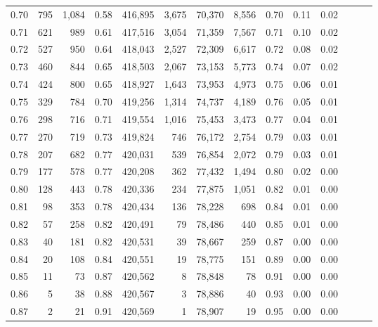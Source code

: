 \begin{tabular}{rrrrrrrrrrrrrr}
0.70 &     795 &  1,084 &  0.58 &  416,895 &    3,675 &  70,370 &   8,556 &  0.70 &  0.11 &      0.02 \\
0.71 &     621 &    989 &  0.61 &  417,516 &    3,054 &  71,359 &   7,567 &  0.71 &  0.10 &      0.02 \\
0.72 &     527 &    950 &  0.64 &  418,043 &    2,527 &  72,309 &   6,617 &  0.72 &  0.08 &      0.02 \\
0.73 &     460 &    844 &  0.65 &  418,503 &    2,067 &  73,153 &   5,773 &  0.74 &  0.07 &      0.02 \\
0.74 &     424 &    800 &  0.65 &  418,927 &    1,643 &  73,953 &   4,973 &  0.75 &  0.06 &      0.01 \\
0.75 &     329 &    784 &  0.70 &  419,256 &    1,314 &  74,737 &   4,189 &  0.76 &  0.05 &      0.01 \\
0.76 &     298 &    716 &  0.71 &  419,554 &    1,016 &  75,453 &   3,473 &  0.77 &  0.04 &      0.01 \\
0.77 &     270 &    719 &  0.73 &  419,824 &      746 &  76,172 &   2,754 &  0.79 &  0.03 &      0.01 \\
0.78 &     207 &    682 &  0.77 &  420,031 &      539 &  76,854 &   2,072 &  0.79 &  0.03 &      0.01 \\
0.79 &     177 &    578 &  0.77 &  420,208 &      362 &  77,432 &   1,494 &  0.80 &  0.02 &      0.00 \\
0.80 &     128 &    443 &  0.78 &  420,336 &      234 &  77,875 &   1,051 &  0.82 &  0.01 &      0.00 \\
0.81 &      98 &    353 &  0.78 &  420,434 &      136 &  78,228 &     698 &  0.84 &  0.01 &      0.00 \\
0.82 &      57 &    258 &  0.82 &  420,491 &       79 &  78,486 &     440 &  0.85 &  0.01 &      0.00 \\
0.83 &      40 &    181 &  0.82 &  420,531 &       39 &  78,667 &     259 &  0.87 &  0.00 &      0.00 \\
0.84 &      20 &    108 &  0.84 &  420,551 &       19 &  78,775 &     151 &  0.89 &  0.00 &      0.00 \\
0.85 &      11 &     73 &  0.87 &  420,562 &        8 &  78,848 &      78 &  0.91 &  0.00 &      0.00 \\
0.86 &       5 &     38 &  0.88 &  420,567 &        3 &  78,886 &      40 &  0.93 &  0.00 &      0.00 \\
0.87 &       2 &     21 &  0.91 &  420,569 &        1 &  78,907 &      19 &  0.95 &  0.00 &      0.00 \\

\end{tabular}
